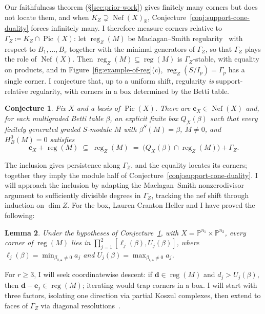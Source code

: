 \documentclass[11pt,reqno]{amsart}
\newtheorem{lemma}{Lemma}[section]
\newtheorem{conjecture}[lemma]{Conjecture}
\theoremstyle{remark}
\newcommand{\reg}{\operatorname{reg}}
\newcommand{\Pic}{\operatorname{Pic}}
\newcommand{\Nef}{\operatorname{Nef}}
\renewcommand{\aa}{\mathbf{a}}
\newcommand{\dd}{\mathbf{d}}
\newcommand{\PP}{\mathbb{P}}
\newcommand{\RR}{\mathbb{R}}
\begin{document}
Our faithfulness theorem (\S\ref{sec:prior-work}) gives finitely many corners but does not locate them, and when $K_Z\supsetneq\Nef(X)_{\RR}$, Conjecture~\ref{conj:support-cone-duality} forces infinitely many. I therefore measure corners relative to $\Gamma_Z\coloneqq K_Z\cap\Pic(X)$: let $\reg_Z(M)$ be Maclagan--Smith regularity~\cite{maclaganSmith04} with respect to $B_1,\ldots,B_s$ together with the minimal generators of $\Gamma_Z$, so that $\Gamma_Z$ plays the role of $\Nef(X)$. Then $\reg_Z(M)\subseteq\reg(M)$ is $\Gamma_Z$-stable, with equality on products, and in Figure~\ref{fig:example-of-reg}(c), $\reg_Z(S/I_p)=\Gamma_p$ has a single corner. I conjecture that, up to a uniform shift, regularity \emph{is} support-relative regularity, with corners in a box determined by the Betti table.

\begin{conjecture}\label{conj:betti-boxes}
Fix $X$ and a basis of $\Pic(X)$. There are $\mathbf c_X\in\Nef(X)$ and, for each multigraded Betti table $\beta$, an explicit finite box $Q_X(\beta)$ such that every finitely generated graded $S$-module $M$ with $\beta^S(M)=\beta$, $\widetilde M\ne0$, and $H_B^0(M)=0$ satisfies
\[
\mathbf c_X+\reg(M)\;\subseteq\;\reg_Z(M)\;=\;\big(Q_X(\beta)\cap\reg_Z(M)\big)+\Gamma_Z.
\]
\end{conjecture}
The inclusion gives persistence along $\Gamma_Z$, and the equality locates its corners; together they imply the module half of Conjecture~\ref{conj:support-cone-duality}. I will approach the inclusion by adapting the Maclagan--Smith nonzerodivisor argument to sufficiently divisible degrees in $\Gamma_Z$, tracking the nef shift through induction on $\dim Z$. For the box, Lauren Cranton Heller and I have proved the following:

\begin{lemma}\label{lem:bigraded-betti-box}
Under the hypotheses of Conjecture~\ref{conj:betti-boxes},
with $X=\PP^{n_1}\times\PP^{n_2}$, every corner of $\reg(M)$
lies in $\prod_{j=1}^2[\ell_j(\beta),U_j(\beta)]$, where
$\ell_j(\beta)=\min_{\beta_{0,\aa}\ne0}a_j$ and
$U_j(\beta)=\max_{\beta_{i,\aa}\ne0}a_j$.
\end{lemma}

For $r\ge3$, I will seek coordinatewise descent: if $\dd\in\reg(M)$ and $d_j>U_j(\beta)$, then $\dd-\mathbf e_j\in\reg(M)$; iterating would trap corners in a box. I will start with three factors, isolating one direction via partial Koszul complexes, then extend to faces of $\Gamma_Z$ via diagonal resolutions~\cite{botbolChardin17,chardinHolanda22,HHL24,brownSayrafi24}.
\end{document}
